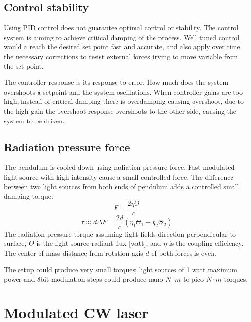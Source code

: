 \documentclass[\main/master.tex]{subfiles}
\begin{document}
\subsection{Control stability}
Using PID control does not guarantee optimal control or stability. The control system is aiming to achieve critical damping of the process. Well tuned control would a reach the desired set point fast and accurate, and also apply over time the necessary corrections to resist external forces trying to move variable from the set point.
\par\noindent
The controller response is its response to error. How much does the system overshoots a setpoint and the system oscillations. When controller gains are too high, instead of critical damping there is overdamping causing overshoot, due to the high gain the overshoot response overshoots to the other side, causing the system to be driven.
\subsection{Radiation pressure force}
The pendulum is cooled down using radiation pressure force. Fast modulated light source with high intensity cause a small controlled force. The difference between two light sources from both ends of pendulum adds a controlled small damping torque. 
\begin{equation}
F = \frac{2\eta\Theta}{{c}} \label{eqn:radiation force}
\end{equation}
\begin{equation}
\tau\approx d\Delta F = \frac{2d}{{c}} (\eta_1\Theta_1 -\eta_2\Theta_2) \label{eqn:radiation torque}
\end{equation}
The radiation pressure torque assuming light fields direction perpendicular to surface, $\Theta$ is the light source radiant flux [watt], and $\eta$ is the coupling efficiency. The center of mass distance from rotation axis $d$ of both forces is even.
\par\noindent
The setup could produce very small torques; light sources of 1 watt maximum power and 8bit modulation steps could produce nano-$N\cdot m$ to pico-$N\cdot m$ torques. 










\section{Modulated CW laser}
\end{document}

